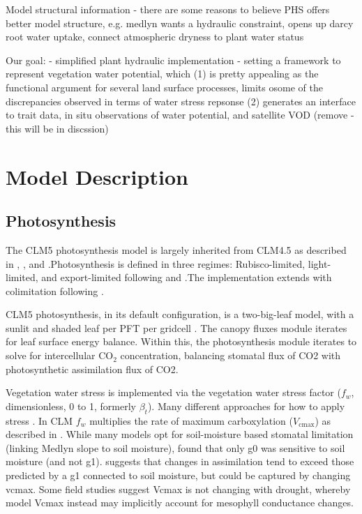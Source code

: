 \documentclass[draft,linenumbers]{agujournal}
\begin{document}
Model structural information
  - there are some reasons to believe PHS offers better model structure,
  e.g. medlyn wants a hydraulic constraint, opens up darcy root water uptake, connect atmospheric dryness to plant water status
  
Our goal:
  - simplified plant hydraulic implementation
  - setting a framework to represent vegetation water potential, which
  (1) is pretty appealing as the functional argument for several land surface processes, limits osome of the discrepancies observed in terms of water stress repsonse
  (2) generates an interface to trait data, in situ observations of water potential, and satellite VOD \citep{momen2017} (remove - this will be in discssion)


\section{Model Description}

\subsection{Photosynthesis}
\label{sect:A}
    The CLM5 photosynthesis model is largely inherited from CLM4.5 as described in \citet{bonan2011}, \citet{thornton2007},
    and \citet{oleson2013}.Photosynthesis is defined in three regimes: Rubisco-limited, light-limited, and export-limited 
    following \citet{farquhar1980} and \citet{harley1992}.The implementation extends \citet{sellers1996a,sellers1996b} with 
    colimitation following \citet{collatz1991}. 
    
    CLM5 photosynthesis, in its default configuration, is a two-big-leaf model, with a sunlit and shaded leaf per PFT per gridcell \citep{thornton2007, dai2004, oleson2013}. 
    The canopy fluxes module iterates for leaf surface energy balance.
    Within this, the photosynthesis module iterates to solve for intercellular CO$_2$ concentration, balancing stomatal flux of 
    CO2 with photosynthetic assimilation flux of CO2.
    
    Vegetation water stress is implemented via the vegetation water stress factor ($f_w$, dimensionless, 0 to 1, formerly $\beta_t$). 
    Many different approaches for how to apply stress \citep{zhou2013,novick2016a}.
    In CLM $f_w$ multiplies the rate of maximum carboxylation ($V_{\text{cmax}}$) as described in \citet{oleson2013}.
    While many models opt for soil-moisture based stomatal limitation (linking Medlyn slope to soil moisture),
    \cite{lin2018} found that only g0 was sensitive to soil moisture (and not g1).
    \cite{zhou2013} suggests that changes in assimilation tend to exceed those predicted by a g1 connected to soil moisture, but could be captured by changing vcmax.
    Some field studies suggest Vcmax is not changing with drought, whereby model Vcmax instead may implicitly account for mesophyll conductance changes.
    
\end{document}
